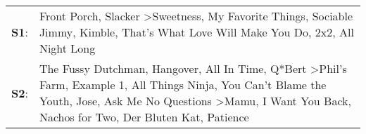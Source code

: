 \begin{supertabular}{p{0.03\textwidth}p{0.92\textwidth}}
 \textbf{S1}:  &                                                                                                                                                                                                                                                               Front Porch\textsuperscript{}, \enspace Slacker\textsuperscript{} \textgreater \enspace Sweetness\textsuperscript{}, \enspace My Favorite Things\textsuperscript{}, \enspace Sociable Jimmy\textsuperscript{}, \enspace Kimble\textsuperscript{}, \enspace That's What Love Will Make You Do\textsuperscript{}, \enspace 2x2\textsuperscript{}, \enspace All Night Long\textsuperscript{}  \enspace  \\
 \textbf{S2}:  &  The Fussy Dutchman\textsuperscript{}, \enspace Hangover\textsuperscript{}, \enspace All In Time\textsuperscript{}, \enspace Q*Bert\textsuperscript{} \textgreater \enspace Phil's Farm\textsuperscript{}, \enspace Example 1\textsuperscript{}, \enspace All Things Ninja\textsuperscript{}, \enspace You Can't Blame the Youth\textsuperscript{}, \enspace Jose\textsuperscript{}, \enspace Ask Me No Questions\textsuperscript{} \textgreater \enspace Mamu\textsuperscript{}, \enspace I Want You Back\textsuperscript{}, \enspace Nachos for Two\textsuperscript{}, \enspace Der Bluten Kat\textsuperscript{}, \enspace Patience\textsuperscript{}  \enspace  \\
\end{supertabular}
